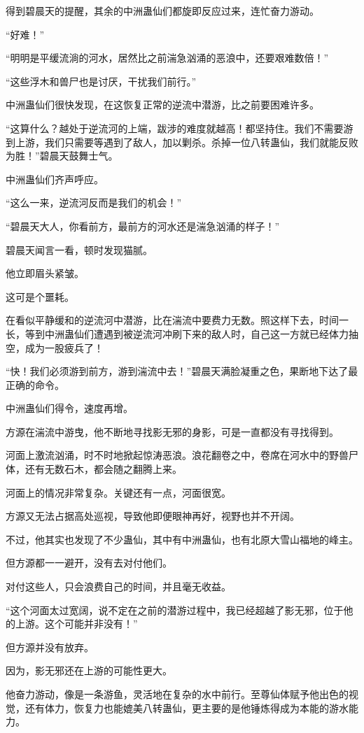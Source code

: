 \begin{this_body}
得到碧晨天的提醒，其余的中洲蛊仙们都旋即反应过来，连忙奋力游动。

“好难！”

“明明是平缓流淌的河水，居然比之前湍急汹涌的恶浪中，还要艰难数倍！”

“这些浮木和兽尸也是讨厌，干扰我们前行。”

中洲蛊仙们很快发现，在这恢复正常的逆流中潜游，比之前要困难许多。

“这算什么？越处于逆流河的上端，跋涉的难度就越高！都坚持住。我们不需要游到上游，我们只需要等遇到了敌人，加以剿杀。杀掉一位八转蛊仙，我们就能反败为胜！”碧晨天鼓舞士气。

中洲蛊仙们齐声呼应。

“这么一来，逆流河反而是我们的机会！”

“碧晨天大人，你看前方，最前方的河水还是湍急汹涌的样子！”

碧晨天闻言一看，顿时发现猫腻。

他立即眉头紧皱。

这可是个噩耗。

在看似平静缓和的逆流河中潜游，比在湍流中要费力无数。照这样下去，时间一长，等到中洲蛊仙们遭遇到被逆流河冲刷下来的敌人时，自己这一方就已经体力抽空，成为一股疲兵了！

“快！我们必须游到前方，游到湍流中去！”碧晨天满脸凝重之色，果断地下达了最正确的命令。

中洲蛊仙们得令，速度再增。

方源在湍流中游曳，他不断地寻找影无邪的身影，可是一直都没有寻找得到。

河面上激流汹涌，时不时地掀起惊涛恶浪。浪花翻卷之中，卷席在河水中的野兽尸体，还有无数石木，都会随之翻腾上来。

河面上的情况非常复杂。关键还有一点，河面很宽。

方源又无法占据高处巡视，导致他即便眼神再好，视野也并不开阔。

不过，他其实也发现了不少蛊仙，其中有中洲蛊仙，也有北原大雪山福地的峰主。

但方源都一一避开，没有去对付他们。

对付这些人，只会浪费自己的时间，并且毫无收益。

“这个河面太过宽阔，说不定在之前的潜游过程中，我已经超越了影无邪，位于他的上游。这个可能并非没有！”

但方源并没有放弃。

因为，影无邪还在上游的可能性更大。

他奋力游动，像是一条游鱼，灵活地在复杂的水中前行。至尊仙体赋予他出色的视觉，还有体力，恢复力也能媲美八转蛊仙，更主要的是他锤炼得成为本能的游水能力。


\end{this_body}
